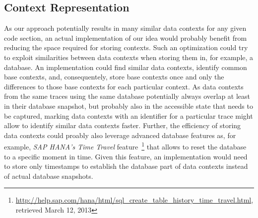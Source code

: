 \subsection{Context Representation}
As our approach potentially results in many similar data contexts for any given code section, an actual implementation of our idea would probably benefit from reducing the space required for storing contexts.
Such an optimization could try to exploit similarities between data contexts when storing them in, for example, a database.
An implementation could find similar data contexts, identify common base contexts, and, consequentely, store base contexts once and only the differences to those base contexts for each particular context.
As data contexts from the same traces using the same database potentially always overlap at least in their database snapshot, but probably also in the accessible state that needs to be captured, marking data contexts with an identifier for a particular trace might allow to identify similar data contexts faster.
Further, the efficiency of storing data contexts could proably also leverage advanced database features as, for example, \emph{SAP HANA's Time Travel} feature~\footnote{\url{http://help.sap.com/hana/html/sql_create_table_history_time_travel.html}, retrieved March 12, 2013} that allows to reset the database to a specific moment in time.
Given this feature, an implementation would need to store only timestamps to establish the database part of data contexts instead of actual database snapshots.
